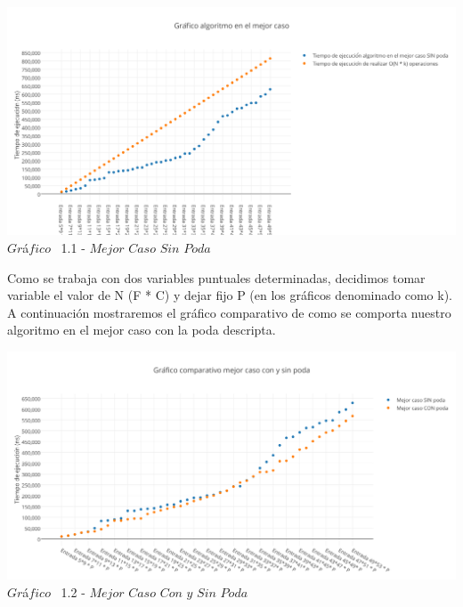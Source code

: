 \vspace*{0.3cm} \vspace*{0.3cm}
  \begin{center}
 \includegraphics[scale=0.65]{./EJ1/mejorcaso.png}
 {$Gr$\'a$fico$ \ 1.1 - $Mejor$ $Caso$ $Sin$ $Poda$}
  \end{center}
  \vspace*{0.3cm}

Como se trabaja con dos variables puntuales determinadas, decidimos tomar variable el valor de N (F * C) y dejar fijo P (en los gr\'aficos denominado como k).\\
A continuaci\'on mostraremos el gr\'afico comparativo de como se comporta nuestro algoritmo en el mejor caso con la poda descripta.\\

\vspace*{0.3cm} \vspace*{0.3cm}
  \begin{center}
 \includegraphics[scale=0.65]{./EJ1/mejorcaso1.png}
 {$Gr$\'a$fico$ \ 1.2 - $Mejor$ $Caso$ $Con$ $y$ $Sin$ $Poda$}
  \end{center}
  \vspace*{0.3cm}

